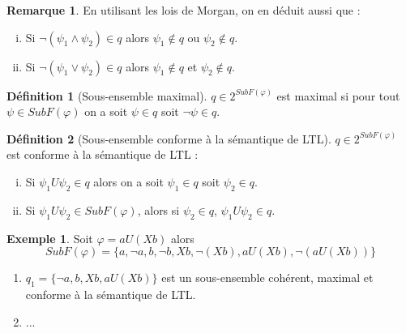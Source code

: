\documentclass[12pt,a4paper]{article}
\theoremstyle{plain}
\theoremstyle{definition}
\newtheorem{defi}{Définition}
\newtheorem{rmq}{Remarque}
\newtheorem{ex}{Exemple}
\begin{document}
\begin{rmq}
  En utilisant les lois de Morgan, on en déduit aussi que :
  \begin{enumerate}[(i)]
  \item Si $\lnot (\psi_1 \land \psi_2) \in q$ alors $\psi_1 \not \in q$ ou $\psi_2 \not \in q$.
  \item Si $\lnot (\psi_1 \lor \psi_2) \in q$ alors $\psi_1 \not \in q$ et $\psi_2 \not \in q$.
  \end{enumerate}
\end{rmq}


\begin{defi}[Sous-ensemble maximal]
  $q \in 2^{SubF(\varphi)}$ est maximal si pour tout $\psi \in SubF(\varphi)$ on a soit $\psi \in q$ soit $\lnot \psi \in q$.  
\end{defi}

\begin{defi}[Sous-ensemble conforme à la sémantique de LTL]
  $q \in 2^{SubF(\varphi)}$ est conforme à la sémantique de LTL :
  \begin{enumerate}[(i)]
  \item Si $\psi_1 U \psi_2 \in q$ alors on a soit $\psi_1 \in q$ soit $\psi_2 \in q$.
  \item Si $\psi_1 U \psi_2 \in SubF(\varphi)$, alors si $\psi_2 \in q$, $\psi_1 U \psi_2 \in q$.
  \end{enumerate}
\end{defi}

\begin{ex}
  Soit $\varphi = a U (Xb)$ alors
  \[
    SubF(\varphi) = \{a, \lnot a, b, \lnot b, Xb, \lnot (Xb), a U (Xb), \lnot (aU(Xb))\}
  \]
  \begin{enumerate}
  \item $q_1 = \{\lnot a, b, Xb, a U (Xb)\}$ est un sous-ensemble cohérent, maximal et conforme à la sémantique de LTL.
  \item ...
  \end{enumerate}
\end{ex}
\end{document}
